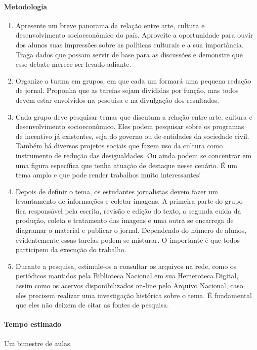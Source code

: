 \documentclass[12pt]{extarticle}
\begin{document}
\paragraph{Metodologia} 
\begin{enumerate}
\item Apresente um breve panorama da relação entre
arte, cultura e desenvolvimento socioeconômico do país. Aproveite a
oportunidade para ouvir dos alunos suas impressões sobre as políticas
culturais e a sua importância. Traga dados que possam servir de base
para as discussões e demonstre que esse debate merece ser levado
adiante.

\item Organize a turma em grupos, em que cada um formará uma pequena
redação de jornal. Proponha que as tarefas sejam divididas por função,
mas todos devem estar envolvidos na pesquisa e na divulgação dos
resultados.

\item Cada grupo deve pesquisar temas que discutam a relação entre arte,
cultura e desenvolvimento socioeconômico. Eles podem pesquisar sobre os
programas de incentivo já existentes, seja do governo ou de entidades da
sociedade civil. Também há diversos projetos sociais que fazem uso da
cultura como instrumento de redução das desigualdades. Ou ainda podem se
concentrar em uma figura específica que tenha atuação de destaque nesse
cenário. É um tema amplo e que pode render trabalhos muito
interessantes!

\item Depois de definir o tema, os estudantes jornalistas devem fazer um
levantamento de informações e coletar imagens. A primeira parte do grupo
fica responsável pela escrita, revisão e edição do texto, a segunda
cuida da produção, coleta e tratamento das imagens e uma outra se
encarrega de diagramar o material e publicar o jornal. Dependendo do
número de alunos, evidentemente essas tarefas podem se misturar. O
importante é que todos participem da execução do trabalho.

\item Durante a pesquisa, estimule-os a consultar os arquivos na rede, como
os periódicos mantidos pela Biblioteca Nacional em sua Hemeroteca
Digital, assim como os acervos disponibilizados on-line pelo Arquivo
Nacional, caso eles precisem realizar uma investigação histórica sobre o
tema. É fundamental que eles não deixem de citar as fontes de pesquisa.
\end{enumerate}

\paragraph{Tempo estimado} Um bimestre de aulas.
\end{document}
